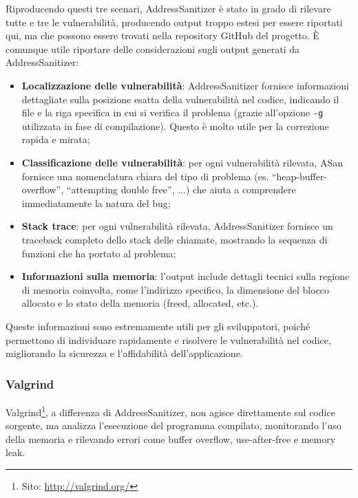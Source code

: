 Riproducendo questi tre scenari, AddressSanitizer è stato in grado di rilevare
tutte e tre le vulnerabilità, producendo output troppo estesi per essere riportati
qui, ma che possono essere trovati nella repository GitHub del progetto. È comunque
utile riportare delle considerazioni sugli output generati da AddressSanitizer:
\begin{itemize}
  \item \textbf{Localizzazione delle vulnerabilità}: AddressSanitizer fornisce informazioni
    dettagliate sulla posizione esatta della vulnerabilità nel codice, indicando
    il file e la riga specifica in cui si verifica il problema (grazie all'opzione
    \texttt{-g} utilizzata in fase di compilazione). Questo è molto utile per la
    correzione rapida e mirata;

  \item \textbf{Classificazione delle vulnerabilità}: per ogni vulnerabilità rilevata,
    ASan fornisce una nomenclatura chiara del tipo di problema (es. ``heap-buffer-overflow'',
    ``attempting double free'', ...) che aiuta a comprendere immediatamente la natura
    del bug;

  \item \textbf{Stack trace}: per ogni vulnerabilità rilevata, AddressSanitizer
    fornisce un traceback completo dello stack delle chiamate, mostrando la sequenza
    di funzioni che ha portato al problema;

  \item \textbf{Informazioni sulla memoria}: l'output include dettagli tecnici sulla
    regione di memoria coinvolta, come l'indirizzo specifico, la dimensione del blocco
    allocato e lo stato della memoria (freed, allocated, etc.).
\end{itemize}

Queste informazioni sono estremamente utili per gli sviluppatori, poiché
permettono di individuare rapidamente e risolvere le vulnerabilità nel codice, migliorando
la sicurezza e l'affidabilità dell'applicazione.

\subsubsection*{Valgrind}
\label{subsubsec:valgrind} Valgrind\footnote{Sito: \url{http://valgrind.org/}}, a
differenza di AddressSanitizer, non agisce direttamente sul codice sorgente, ma analizza
l'esecuzione del programma compilato, monitorando l'uso della memoria e
rilevando errori come buffer overflow, use-after-free e memory leak.

